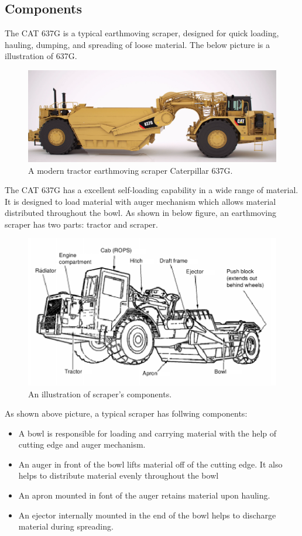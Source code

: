 \documentclass[a4paper,man,natbib]{apa6}
\begin{document}
\subsection{Components}

The CAT 637G is a typical earthmoving scraper, designed for quick loading, hauling, dumping, and spreading of loose material. The below picture is a illustration of 637G.
\begin{figure}[!ht]
\centering
\includegraphics[width=\textwidth]{637G_scraper.png}
\centering\caption{\label{fig:crpr}A modern tractor earthmoving scraper Caterpillar 637G. \citep{THMPIndst}}
\end{figure}

The CAT 637G has a excellent self-loading capability in a wide range of material. It is designed to load material with auger mechanism which allows material distributed throughout the bowl. As shown in below figure, an earthmoving scraper has two parts: tractor and scraper.  
\begin{figure}[!ht]
\centering
\includegraphics[width=\textwidth]{scraper_components.png}
\centering\caption{\label{fig:scprcmp}An illustration of scraper's components. \citep{DTMTrmy}}
\end{figure}

As shown above picture, a typical scraper has follwing components:
\begin{itemize}
\item A bowl is responsible for loading and carrying material with the help of cutting edge and auger mechanism. 
\item An auger in front of the bowl lifts material off of the cutting edge. It also helps to distribute material evenly throughout the bowl 
\item An apron mounted in font of the auger retains material upon hauling.
\item An ejector internally mounted in the end of the bowl helps to discharge material during spreading. 
\end{itemize}
\end{document}
